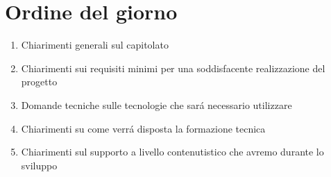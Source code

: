 \documentclass[a4paper,12pt]{article}
\begin{document}
\section{Ordine del giorno}

\begin{enumerate}
    \item Chiarimenti generali sul capitolato
    \item Chiarimenti sui requisiti minimi per una soddisfacente realizzazione del progetto
    \item Domande tecniche sulle tecnologie che sará necessario utilizzare
    \item Chiarimenti su come verrá disposta la formazione tecnica
    \item Chiarimenti sul supporto a livello contenutistico che avremo durante lo sviluppo
\end{enumerate}
\end{document}
